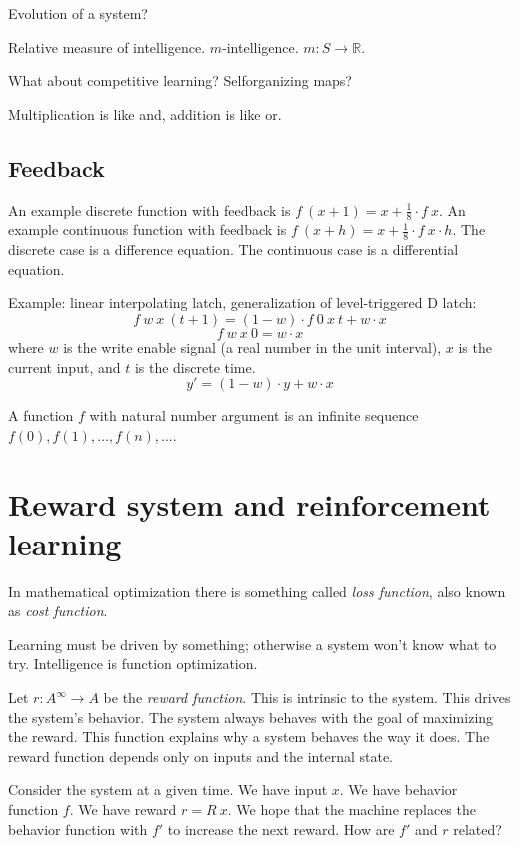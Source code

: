 Evolution of a system?

Relative measure of intelligence.
\(m\)-intelligence.
\(m : S \to \mathbb{R}\).

What about competitive learning? Selforganizing maps?

Multiplication is like and, addition is like or.

\subsection{Feedback}

An example discrete function with feedback is
\( f~(x+1) = x + \frac{1}{8} \cdot f~x \).
An example continuous function with feedback is
\( f~(x+h) = x + \frac{1}{8} \cdot f~x \cdot h \).
The discrete case is a difference equation.
The continuous case is a differential equation.

Example: linear interpolating latch,
generalization of level-triggered D latch:
\[
    f~w~x~(t+1) = (1 - w) \cdot f~0~x~t + w \cdot x
\]
\[
    f~w~x~0 = w \cdot x
\]
where \(w\) is the write enable signal
(a real number in the unit interval),
\(x\) is the current input,
and \(t\) is the discrete time.
\[
    y' = (1 - w) \cdot y + w \cdot x
\]

A function \(f\) with natural number argument
is an infinite sequence \(f(0), f(1), \ldots, f(n), \ldots\).

\section{Reward system and reinforcement learning}

In mathematical optimization there is something called
\emph{loss function}, also known as \emph{cost function}.

Learning must be driven by something;
otherwise a system won't know what to try.
Intelligence is function optimization.

Let \( r : A^\infty \to A \) be the \emph{reward function}.
This is intrinsic to the system.
This drives the system's behavior.
The system always behaves with the goal of maximizing the reward.
This function explains why a system behaves the way it does.
The reward function depends only on inputs and the internal state.

Consider the system at a given time.
We have input \(x\).
We have behavior function \(f\).
We have reward \(r = R~x\).
We hope that the machine
replaces the behavior function with \(f'\)
to increase the next reward.
How are \(f'\) and \(r\) related?

